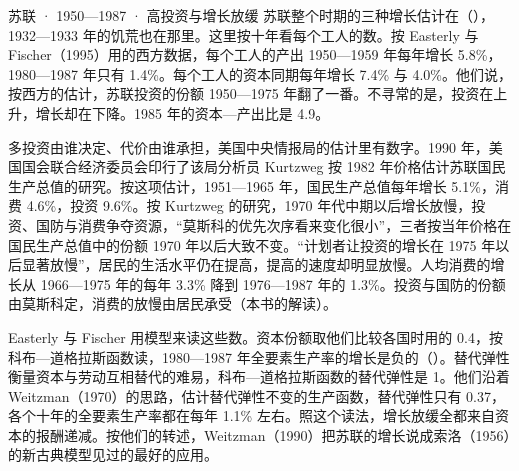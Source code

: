 \begin{case}{苏联 · 1950—1987 · 高投资与增长放缓}
苏联整个时期的三种增长估计在（），1932—1933 年的饥荒也在那里。这里按十年看每个工人的数。按 Easterly 与 Fischer（1995）用的西方数据，每个工人的产出 1950—1959 年每年增长 5.8\%，1980—1987 年只有 1.4\%\cite{ef1995}。每个工人的资本同期每年增长 7.4\% 与 4.0\%\cite{ef1995}。他们说，按西方的估计，苏联投资的份额 1950—1975 年翻了一番\cite{ef1995}。不寻常的是，投资在上升，增长却在下降\cite{ef1995}。1985 年的资本—产出比是 4.9\cite{ef1995}。

多投资由谁决定、代价由谁承担，美国中央情报局的估计里有数字。1990 年，美国国会联合经济委员会印行了该局分析员 Kurtzweg 按 1982 年价格估计苏联国民生产总值的研究\cite{jec1990}。按这项估计，1951—1965 年，国民生产总值每年增长 5.1\%，消费 4.6\%，投资 9.6\%\cite{jec1990}。按 Kurtzweg 的研究，1970 年代中期以后增长放慢，投资、国防与消费争夺资源，“莫斯科的优先次序看来变化很小”，三者按当年价格在国民生产总值中的份额 1970 年以后大致不变\cite{jec1990}。“计划者让投资的增长在 1975 年以后显著放慢”，居民的生活水平仍在提高，提高的速度却明显放慢\cite{jec1990}。人均消费的增长从 1966—1975 年的每年 3.3\% 降到 1976—1987 年的 1.3\%\cite{jec1990}。投资与国防的份额由莫斯科定，消费的放慢由居民承受（本书的解读）。

Easterly 与 Fischer 用模型来读这些数。资本份额取他们比较各国时用的 0.4，按科布—道格拉斯函数读，1980—1987 年全要素生产率的增长是负的（）。替代弹性衡量资本与劳动互相替代的难易，科布—道格拉斯函数的替代弹性是 1。他们沿着 Weitzman（1970）的思路，估计替代弹性不变的生产函数，替代弹性只有 0.37，各个十年的全要素生产率都在每年 1.1\% 左右\cite{ef1995}。照这个读法，增长放缓全都来自资本的报酬递减\cite{ef1995}。按他们的转述，Weitzman（1990）把苏联的增长说成索洛（1956）的新古典模型见过的最好的应用\cite{ef1995}。
\end{case}


